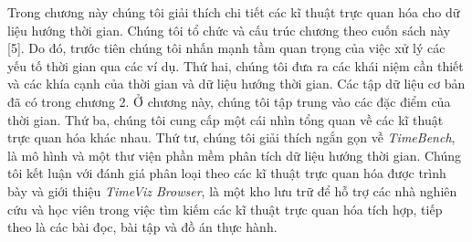 Trong chương này chúng tôi giải thích chi tiết các kĩ thuật trực quan hóa cho dữ liệu hướng thời gian. Chúng tôi tổ chức và cấu trúc chương theo cuốn sách này [5]. Do đó, trước tiên chúng tôi nhấn mạnh tầm quan trọng của việc xử lý các yếu tố thời gian qua các ví dụ. Thứ hai, chúng tôi đưa ra các khái niệm cần thiết và các khía cạnh của thời gian và dữ liệu hướng thời gian. Các tập dữ liệu cơ bản đã có trong chương 2. Ở chương này, chúng tôi tập trung vào các đặc điểm của thời gian. Thứ ba, chúng tôi cung cấp một cái nhìn tổng quan về các kĩ thuật trực quan hóa khác nhau. Thứ tư, chúng tôi giải thích ngắn gọn về  \textit{TimeBench}, là mô hình và một thư viện phần mềm phân tích dữ liệu hướng thời gian. Chúng tôi kết luận với đánh giá phân loại theo các kĩ thuật trực quan hóa được trình bày và giới thiệu \textit{TimeViz Browser}, là một kho lưu trữ để hỗ trợ các nhà nghiên cứu và học viên trong việc tìm kiếm các kĩ thuật trực quan hóa tích hợp, tiếp theo là các bài đọc, bài tập và đồ án thực hành.